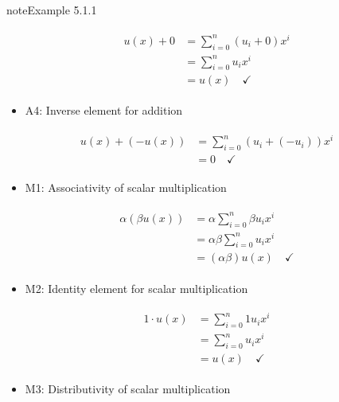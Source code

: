 \documentclass[letterpaper,10pt,english]{jupyterBook}
\begin{document}
\begin{sphinxadmonition}{note}{Example 5.1.1}
\begin{itemize}
\end{itemize}
\begin{equation*}
\begin{split} \begin{align*}
    u(x) + 0 &= \displaystyle \sum_{i=0}^n (u_i + 0)x^i \\
    &= \displaystyle \sum_{i=0}^n u_ix^i \\
    &= u(x) \quad \checkmark
\end{align*} \end{split}
\end{equation*}\begin{itemize}
\item {} 
\sphinxAtStartPar
A4: Inverse element for addition

\end{itemize}
\begin{equation*}
\begin{split} \begin{align*}
    u(x) + (-u(x)) &= \displaystyle \sum_{i=0}^n(u_i + (-u_i)) x^i \\
    &= 0 \quad \checkmark
\end{align*} \end{split}
\end{equation*}\begin{itemize}
\item {} 
\sphinxAtStartPar
M1: Associativity of scalar multiplication

\end{itemize}
\begin{equation*}
\begin{split} \begin{align*}
    \alpha(\beta u(x)) &= \alpha \displaystyle \sum_{i=0}^n \beta u_i x^i \\
    &= \alpha \beta \displaystyle \sum_{i=0}^n u_i x^i \\
    &= (\alpha \beta) u(x) \quad \checkmark
\end{align*} \end{split}
\end{equation*}\begin{itemize}
\item {} 
\sphinxAtStartPar
M2: Identity element for scalar multiplication

\end{itemize}
\begin{equation*}
\begin{split} \begin{align*}
    1 \cdot u(x) &= \displaystyle \sum_{i=0}^n 1 u_i x^i \\
    &= \displaystyle \sum_{i=0}^n u_i x^i \\
    &= u(x) \quad \checkmark
\end{align*} \end{split}
\end{equation*}\begin{itemize}
\item {} 
\sphinxAtStartPar
M3: Distributivity of scalar multiplication


\end{itemize}
\end{sphinxadmonition}
\end{document}
